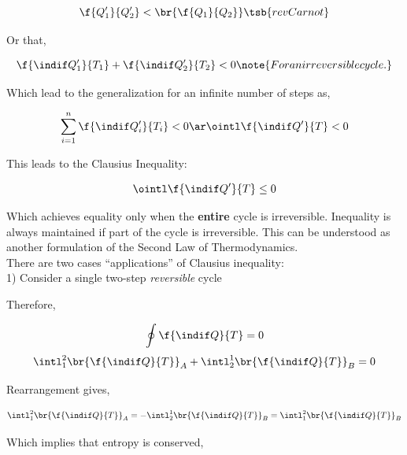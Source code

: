 \documentclass{article}
\begin{document}
\[ \f{Q'_1}{Q'_2} < \br{\f{Q_1}{Q_2}}\tsb{rev Carnot} \]

Or that,

\[ \f{\indif Q'_1}{T_1} + \f{\indif Q'_2}{T_2} < 0 \note{For an irreversible cycle.} \]

Which lead to the generalization for an infinite number of steps as,

\[ \sum_{i=1}^{n} \f{\indif Q'_i}{T_i} < 0 \ar \ointl \f{\indif Q'}{T} < 0  \]

This leads to the Clausius Inequality:

\[ \ointl \f{\indif Q'}{T} \leq 0 \]

Which achieves equality only when the \textbf{entire} cycle is irreversible. Inequality is always maintained if  part of the cycle is irreversible. This can be understood as another formulation of the Second Law of Thermodynamics. \\

There are two cases ``applications'' of Clausius inequality: \\

1) Consider a single two-step \textit{reversible} cycle

\begin{center}
\end{center}

Therefore,

\[ \oint \f{\indif Q}{T} = 0 \]
\[ \intl_1^2 \br{\f{\indif Q}{T}}_A + \intl_2^1 \br{\f{\indif Q}{T}}_B = 0 \]

Rearrangement gives,

\[ \intl_1^2 \br{\f{\indif Q}{T}}_A = - \intl_2^1 \br{\f{\indif Q}{T}}_B = \intl_1^2 \br{\f{\indif Q}{T}}_B\]

Which implies that entropy is conserved,
\end{document}
